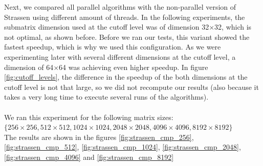 \documentclass{article}
\begin{document}
Next, we compared all parallel algorithms with the non-parallel version of Strassen using different amount of threads. 
In the following experiments, the submatrix dimension used at the cutoff level was of dimension 32$\times$32, which is not optimal, as shown before. 
Before we ran our tests, this variant showed the fastest speedup, which is why we used this configuration.
As we were experimenting later with several different dimensions at the cutoff level, a dimension of 64$\times$64 was achieving even higher speedup.
In figure \ref{fig:cutoff_levels}, the difference in the speedup of the both dimensions at the cutoff
level is not that large, so we did not recompute our results (also because it takes a very long time to execute several runs of the algorithms). \\
\\
We ran this experiment for the following matrix sizes: \\
$\{ 256 \times 256, 512 \times 512, 1024 \times 1024, 2048 \times 2048, 4096 \times 4096, 8192 \times 8192 \}$ \\
The results are shown in the figures \ref{fig:strassen_cmp_256}, \ref{fig:strassen_cmp_512}, \ref{fig:strassen_cmp_1024}, \ref{fig:strassen_cmp_2048}, \ref{fig:strassen_cmp_4096} and \ref{fig:strassen_cmp_8192}
\end{document}
